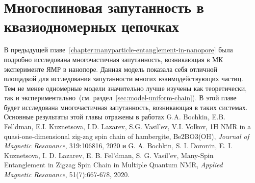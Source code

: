 \chapter{Многоспиновая запутанность в квазиодномерных цепочках}
\label{chapter:manayparticle-entantlement-in-zigzag-chain}

В предыдущей главе~\ref{chapter:manyparticle-entanglement-in-nanopore}
была подробно исследована многочастичная запутанность,
возникающая в МК эксперименте ЯМР в нанопоре.
Данная модель показала себя отличной площадкой
для исследования запутанности многих взаимодействующих частиц.
Тем не менее одномерные модели значительно лучше изучены как теоретически,
так и экспериментально~(см. раздел~\ref{sec:model-uniform-chain}).
В этой главе будет исследована многочастичная запутанность,  возникающая в таких системах. Основные результаты этой главы отражены в работах G.A. Bochkin, E.B. Fel'dman, E.I. Kuznetsova, I.D. Lazarev, S.G. Vasil'ev, V.I. Volkov, 1H NMR in a quasi-one-dimensional zig-zag spin chain of hambergite, Be2BO3(OH), \textit{Journal of Magnetic Resonance}, 319:106816, 2020
и
G. A. Bochkin, S. I. Doronin, E. I. Kuznetsova, I. D. Lazarev, E. B. Fel'dman, S. G. Vasil'ev, Many-Spin Entanglement in Zigzag Spin Chain in Multiple Quantum NMR, \textit{Applied Magnetic Resonance}, 51(7):667-678, 2020.



